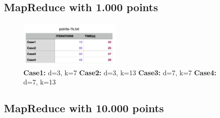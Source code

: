\documentclass{book}
\begin{document}
    \paragraph{}

    \subsection{MapReduce with 1.000 points}
    \paragraph{}

    \begin{figure}[H]
        \hfill
        \hfill
        \hfill
        \includegraphics[width=5cm]{spark/tabella_point1k}
        \centering
        \caption{\footnotesize{\textbf{Case1:} d=3, k=7 \textbf{Case2:} d=3, k=13 \textbf{Case3:} d=7, k=7 \textbf{Case4:} d=7, k=13}}
    \end{figure}

    \subsection{MapReduce with 10.000 points}
    \paragraph{}
\end{document}
